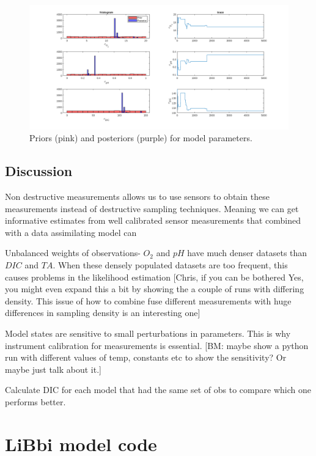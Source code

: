 \documentclass{ruthesis}
\begin{document}
\begin{figure}
	\centerline{\includegraphics[width=1.3\textwidth]{images_microalgae/plots_test/model_parameters3}}
	\caption[.]{Priors (pink) and posteriors (purple) for model parameters.}
	\label{fig:micro_exp_test_parameters_model3}
\end{figure}



\FloatBarrier
\section{Discussion}

Non destructive measurements allows us to use sensors to obtain these measurements instead of destructive sampling techniques. Meaning we can get informative estimates from well calibrated sensor measurements that combined with a data assimilating model can 

Unbalanced weights of observations- $O_2$ and $pH$ have much denser datasets than $DIC$ and $TA$. When these densely populated datasets are too frequent, this causes problems in the likelihood estimation 
[Chris, if you can be bothered Yes,  you might even expand this a bit by showing the a couple of runs with differing density.  This issue of how to combine  fuse different measurements with huge differences in sampling density is an interesting one]

Model states are sensitive to small perturbations in parameters. This is why instrument calibration for measurements is essential. [BM: maybe show a python run with different values of temp, constants etc to show the sensitivity? Or maybe just talk about it.] 

Calculate DIC for each model that had the same set of obs to compare which one performs better.

\appendix

\chapter{LiBbi model code}\label{appendix_micro_libbi_code}
\end{document}
